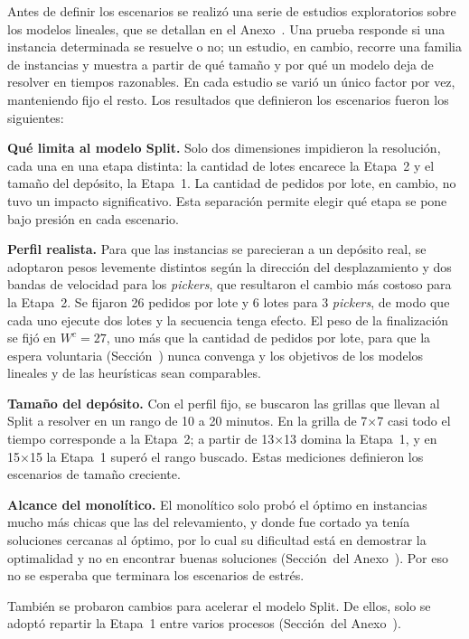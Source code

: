 Antes de definir los escenarios se realizó una serie de estudios
exploratorios sobre los modelos lineales, que se detallan en el
Anexo~. Una prueba responde si una instancia determinada
se resuelve o no; un estudio, en cambio, recorre una familia de instancias y
muestra a partir de qué tamaño y por qué un modelo deja de resolver en
tiempos razonables. En cada estudio se varió un único factor por vez,
manteniendo fijo el resto. Los resultados que definieron los escenarios
fueron los siguientes:
\startitemize
	\item {\bf Qué limita al modelo Split.} Solo dos dimensiones impidieron la
	resolución, cada una en una etapa distinta: la cantidad de lotes encarece
	la Etapa~2 y el tamaño del depósito, la Etapa~1. La cantidad de pedidos por
	lote, en cambio, no tuvo un impacto significativo. Esta separación permite
	elegir qué etapa se pone bajo presión en cada escenario.
	\item {\bf Perfil realista.} Para que las instancias se parecieran a un
	depósito real, se adoptaron pesos levemente distintos según la dirección
	del desplazamiento y dos bandas de velocidad para los {\em pickers}, que
	resultaron el cambio más costoso para la Etapa~2. Se fijaron 26 pedidos
	por lote y 6 lotes para 3 {\em pickers}, de modo que cada uno ejecute dos
	lotes y la secuencia tenga efecto. El peso de la finalización se fijó en
	$W^{c} = 27$, uno más que la cantidad de pedidos por lote, para que la
	espera voluntaria (Sección~) nunca convenga y los
	objetivos de los modelos lineales y de las heurísticas sean comparables.
	\item {\bf Tamaño del depósito.} Con el perfil fijo, se buscaron las
	grillas que llevan al Split a resolver en un rango de 10 a 20 minutos. En
	la grilla de 7×7 casi todo el tiempo corresponde a la Etapa~2; a partir
	de 13×13 domina la Etapa~1, y en 15×15 la Etapa~1 superó el rango
	buscado. Estas mediciones definieron los escenarios de tamaño creciente.
	\item {\bf Alcance del monolítico.} El monolítico solo probó el óptimo en
	instancias mucho más chicas que las del relevamiento, y donde fue
	cortado ya tenía soluciones cercanas al óptimo, por lo cual su dificultad está en
	demostrar la optimalidad y no en encontrar buenas soluciones
	(Sección~ del Anexo~).
	Por eso no se esperaba que terminara los escenarios de estrés.
\stopitemize

También se probaron cambios para acelerar el modelo Split. De ellos, solo
se adoptó repartir la Etapa~1 entre varios procesos
(Sección~ del Anexo~).

